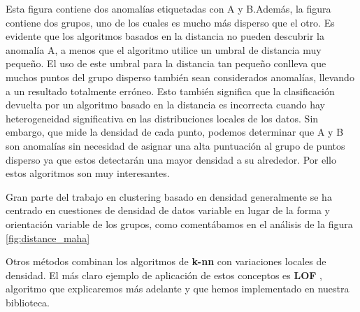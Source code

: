 Esta figura contiene dos anomalías etiquetadas con A y B.Además, la figura 
contiene dos grupos, uno de los cuales es mucho más disperso que el otro.
Es evidente que los algoritmos basados en la distancia no pueden descubrir la
anomalía A, a menos que el algoritmo utilice un umbral de distancia muy pequeño.
El uso de este umbral para la distancia tan pequeño conlleva que muchos puntos
del grupo disperso también sean considerados anomalías, llevando a un resultado 
totalmente erróneo. Esto también significa que la clasificación devuelta por un
algoritmo basado en la distancia es incorrecta cuando hay heterogeneidad 
significativa en las distribuciones locales de los datos. Sin embargo, que mide la 
densidad de cada punto, podemos determinar que A y B son anomalías sin necesidad 
de asignar una alta puntuación al grupo de puntos disperso ya que estos detectarán
una mayor densidad a su alrededor. Por ello estos algoritmos son muy interesantes.


Gran parte del trabajo en clustering basado en densidad generalmente 
se ha centrado en cuestiones de densidad de datos variable en lugar de la forma 
y orientación variable de los grupos, como comentábamos en el análisis de la figura
\ref{fig:distance_maha}


Otros métodos combinan los algoritmos de \textbf{k-nn} con variaciones locales de 
densidad. El más claro ejemplo de aplicación de estos conceptos es \textbf{LOF} 
\cite{breunigLOFIdentifyingDensitybased2000}, algoritmo que explicaremos más adelante
y que hemos implementado en nuestra biblioteca.